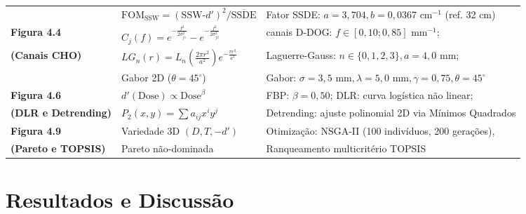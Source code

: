 \documentclass[
  12pt,
  a4paper,
  oneside
]{report}
\begin{document}
\begin{table}[htbp]
\begin{tabularx}{\textwidth}{>{\RaggedRight\bfseries}p{} >{\RaggedRight}p{} >{\RaggedRight\arraybackslash}X}
    & $\text{FOM}_{\text{SSW}} = (\text{SSW-}d')^2 / \overline{\text{SSDE}}$ & Fator SSDE: $a = 3{,}704, b = 0{,}0367\text{ cm}^{-1}$ (ref. 32 cm) \\
    \addlinespace[0.4em]
    Figura 4.4 & $C_j(f) = e^{-\frac{f^2}{2\sigma_{j1}^2}} - e^{-\frac{f^2}{2\sigma_{j2}^2}}$ \cite{myers_barrett_1987} & 5 canais D-DOG: $f \in [0{,}10; 0{,}85]\text{ mm}^{-1}$; \\
    (Canais CHO) & $LG_n(r) = L_n(\frac{2\pi r^2}{a^2}) e^{-\frac{\pi r^2}{a^2}}$ \cite{gallas2003} & Laguerre-Gauss: $n \in \{0, 1, 2, 3\}, a = 4{,}0\text{ mm}$; \\
    & Gabor 2D ($\theta = 45^\circ$) \cite{barrett_myers_2004} & Gabor: $\sigma=3{,}5\text{ mm}, \lambda=5{,}0\text{ mm}, \gamma=0{,}75, \theta=45^\circ$ \\
    \addlinespace[0.4em]
    Figura 4.6 & $d'(\text{Dose}) \propto \text{Dose}^\beta$ \cite{racine2021} & FBP: $\beta = 0{,}50$; DLR: curva logística não linear; \\
    (DLR e Detrending) & $P_2(x, y) = \sum a_{ij} x^i y^j$ \cite{aapm_tg233_2019} & Detrending: ajuste polinomial 2D via Mínimos Quadrados \\
    \addlinespace[0.4em]
    Figura 4.9 & Variedade 3D $(D, T, -d')$ \cite{deb2002} & Otimização: NSGA-II (100 indivíduos, 200 gerações), \\
    (Pareto e TOPSIS) & Pareto não-dominada \cite{hwang1981} & Ranqueamento multicritério TOPSIS \\
    \bottomrule
  \end{tabularx}
  \vspace{0.3em}\par{}
\end{table}

\chapter{Resultados e Discussão}
\label{chap:resultados_discussao}
\end{document}
